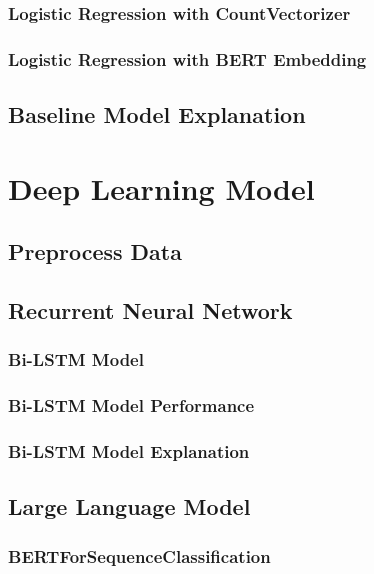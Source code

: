 \documentclass[ %
                    author={Louis Wang},
                supervisor={Dr. Qiang Liu},
                    degree={MSc},
                     title={Identification of Suicide Ideation in Texts},
                      type={},
                      year={2024}]{dissertation}
\begin{document}
\subsection{Logistic Regression with CountVectorizer}

\subsection{Logistic Regression with BERT Embedding}

\section{Baseline Model Explanation}


\chapter{Deep Learning Model}
\label{chap:execution2}

\section{Preprocess Data}

\section{Recurrent Neural Network}

\subsection{Bi-LSTM Model}

\subsection{Bi-LSTM Model Performance}

\subsection{Bi-LSTM Model Explanation}

\section{Large Language Model}

\subsection{BERTForSequenceClassification}
\end{document}
